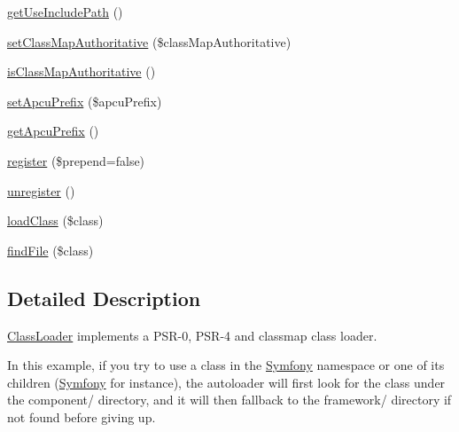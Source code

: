 \begin{DoxyCompactItemize}
\mbox{\hyperlink{class_composer_1_1_autoload_1_1_class_loader_a21c8a2ce47b9ab8184cce5949496414c}{get\+Use\+Include\+Path}} ()
\item 
\mbox{\hyperlink{class_composer_1_1_autoload_1_1_class_loader_aa3d6610396da6f5bef836d4fc5547816}{set\+Class\+Map\+Authoritative}} (\$class\+Map\+Authoritative)
\item 
\mbox{\hyperlink{class_composer_1_1_autoload_1_1_class_loader_a5187f29c880def2863b3592d2cce5844}{is\+Class\+Map\+Authoritative}} ()
\item 
\mbox{\hyperlink{class_composer_1_1_autoload_1_1_class_loader_aad0640d28c755d32a9c4d13322959848}{set\+Apcu\+Prefix}} (\$apcu\+Prefix)
\item 
\mbox{\hyperlink{class_composer_1_1_autoload_1_1_class_loader_a570c1269e2a739a2849b7e579e7d83b9}{get\+Apcu\+Prefix}} ()
\item 
\mbox{\hyperlink{class_composer_1_1_autoload_1_1_class_loader_a3968965f178f6a5ef212b31b72231e69}{register}} (\$prepend=false)
\item 
\mbox{\hyperlink{class_composer_1_1_autoload_1_1_class_loader_a501cedfa611556a0100e024a0e102d9d}{unregister}} ()
\item 
\mbox{\hyperlink{class_composer_1_1_autoload_1_1_class_loader_a8326a997d0cfe76d80196f60d240d144}{load\+Class}} (\$class)
\item 
\mbox{\hyperlink{class_composer_1_1_autoload_1_1_class_loader_a4f8534c9205630e4b9c61e47ebf2867a}{find\+File}} (\$class)
\end{DoxyCompactItemize}


\subsection{Detailed Description}
\mbox{\hyperlink{class_composer_1_1_autoload_1_1_class_loader}{Class\+Loader}} implements a P\+S\+R-\/0, P\+S\+R-\/4 and classmap class loader. 


In this example, if you try to use a class in the \mbox{\hyperlink{namespace_symfony}{Symfony}} namespace or one of its children (\mbox{\hyperlink{namespace_symfony}{Symfony}} for instance), the autoloader will first look for the class under the component/ directory, and it will then fallback to the framework/ directory if not found before giving up.

